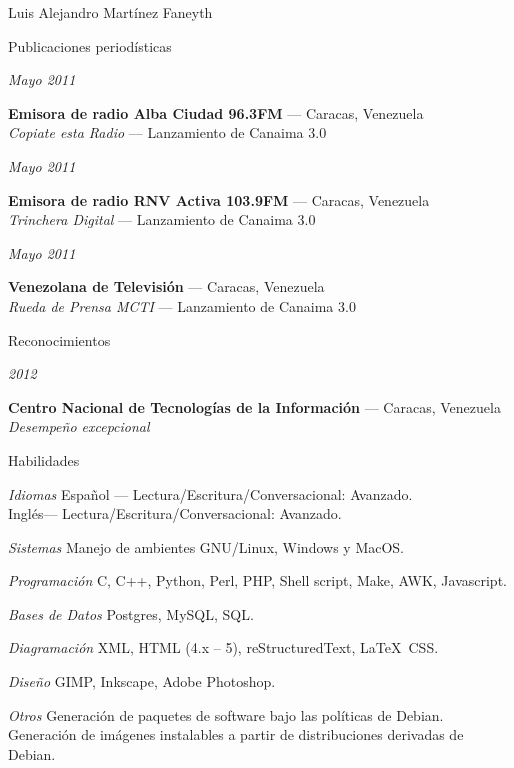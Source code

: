 \documentclass[letterpaper]{scrartcl}
\begin{document}
\begin{cv}{Luis Alejandro Mart\'inez Faneyth}
\begin{cvlist}{Publicaciones periodísticas}
\item[{\parbox[t]{6em}{\textit{\large{Mayo 2011}}}}]{
	\parbox[t]{\linewidth}{
		\textbf{Emisora de radio Alba Ciudad 96.3FM} --- Caracas, Venezuela\\
		\textit{Copiate esta Radio} --- Lanzamiento de Canaima 3.0
	}
}
\item[{\parbox[t]{6em}{\textit{\large{Mayo 2011}}}}]{
	\parbox[t]{\linewidth}{
		\textbf{Emisora de radio RNV Activa 103.9FM} --- Caracas, Venezuela\\
		\textit{Trinchera Digital} --- Lanzamiento de Canaima 3.0
	}
}
\item[{\parbox[t]{6em}{\textit{\large{Mayo 2011}}}}]{
	\parbox[t]{\linewidth}{
		\textbf{Venezolana de Televisi\'on} --- Caracas, Venezuela\\
		\textit{Rueda de Prensa MCTI} --- Lanzamiento de Canaima 3.0
	}
}
\end{cvlist}
\vspace{1em}

\begin{cvlist}{Reconocimientos}
\item[{\parbox[t]{6em}{\textit{\large{2012}}}}]{
	\parbox[t]{\linewidth}{
		\textbf{Centro Nacional de Tecnolog\'ias de la Informaci\'on} --- Caracas, Venezuela\\
		\textit{Desempe\~no excepcional}
	}
}
\end{cvlist}
\vspace{1em}

\begin{cvlist}{Habilidades}
\item[\textit{\large{Idiomas}}]{
	Espa\~nol --- Lectura/Escritura/Conversacional: Avanzado.\\
	Ingl\'es--- Lectura/Escritura/Conversacional: Avanzado.
}
\item[\textit{\large{Sistemas}}]{Manejo de ambientes GNU/Linux, Windows y MacOS.}
\item[\textit{\large{Programaci\'on}}]{C, C++, Python, Perl, PHP, Shell script, Make, AWK, Javascript.}
\item[\textit{\large{Bases de Datos}}]{Postgres, MySQL, SQL.}
\item[\textit{\large{Diagramaci\'on}}]{XML, HTML (4.x -- 5), reStructuredText, \LaTeX\, CSS.}
\item[\textit{\large{Dise\~no}}]{GIMP, Inkscape, Adobe Photoshop.}
\item[\textit{\large{Otros}}]{
	Generaci\'on de paquetes de software bajo las pol\'iticas de Debian.\\
	Generaci\'on de im\'agenes instalables a partir de distribuciones derivadas de Debian.
}
\end{cvlist}

\end{cv}
\end{document}

